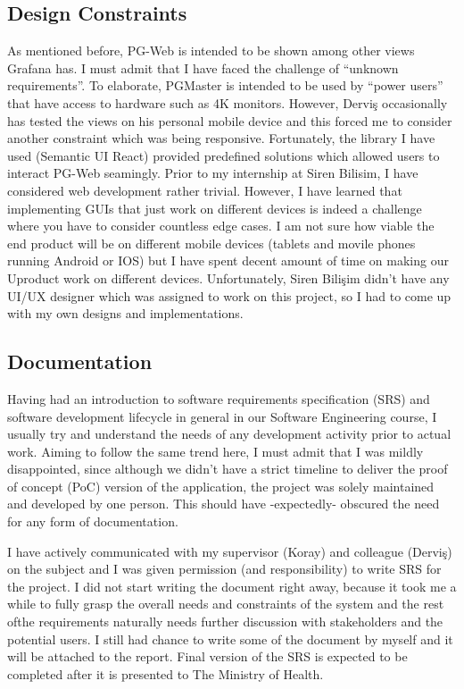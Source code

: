 \subsection{Design Constraints}

As mentioned before, PG-Web is intended to be shown among other views Grafana 
has. I must admit that I have faced the challenge of ``unknown requirements''. 
To elaborate, PGMaster is intended to be used by ``power users'' that have 
access to hardware such as 4K monitors. However, Derviş occasionally has 
tested the views on his personal mobile device and this forced me to consider 
another constraint which was being responsive. Fortunately, the library I have 
used (Semantic UI React) provided predefined solutions which allowed users to 
interact PG-Web seamingly. Prior to my internship at Siren Bilisim, I have 
considered web development rather trivial. However, I have learned that 
implementing GUIs that just work on different devices is indeed a challenge 
where you have to consider countless edge cases. I am not sure how viable the 
end product will be on different mobile devices (tablets and movile phones 
running Android or IOS) but I have spent decent amount of time on making our 
Uproduct work on different devices. Unfortunately, Siren Bilişim didn't have 
any UI/UX designer which was assigned to work on this project, so I had to 
come up with my own designs and implementations.

\subsection{Documentation}

Having had an introduction to software requirements specification (SRS) and 
software development lifecycle in general in our Software Engineering course, 
I usually try and understand the needs of any development activity prior to 
actual work. Aiming to follow the same trend here, I must admit that I was 
mildly disappointed, since although we didn't have a strict timeline to 
deliver the proof of concept (PoC) version of the application, the project 
was solely maintained and developed by one person. This should have 
-expectedly- obscured the need for any form of documentation.
\par I have actively communicated with my supervisor (Koray) and colleague 
(Derviş) on the subject and I was given permission (and responsibility) to 
write SRS for the project. I did not start writing the document right away, 
because it took me a while to fully grasp the overall needs and constraints 
of the system and the rest ofthe requirements naturally needs further 
discussion with stakeholders and the potential users. I still had chance to 
write some of the document by myself and it will be attached to the report. 
Final version of the SRS is expected to be completed after it is presented 
to The Ministry of Health.

